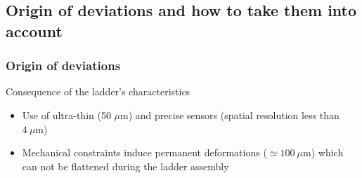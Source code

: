 \documentclass{beamer}
\begin{document}
\begin{frame}
  \vspace{-0.35cm}


\end{frame}

  \subsection{Origin of deviations and how to take them into account}
  \begin{frame}
    \frametitle{Origin of deviations}

    \vspace{-0.2cm}
    \begin{block}{Consequence of the ladder's characteristics}
      \begin{itemize}
        \item Use of ultra-thin (50 $\mu\text{m}$) and precise sensors (spatial resolution less than $4~\mu\text{m}$)
        \item Mechanical constraints induce permanent deformations ($\simeq 100~\mu\text{m}$) which can not be flattened during the ladder assembly
      \end{itemize}
    \end{block}




  \end{frame}
\end{document}

